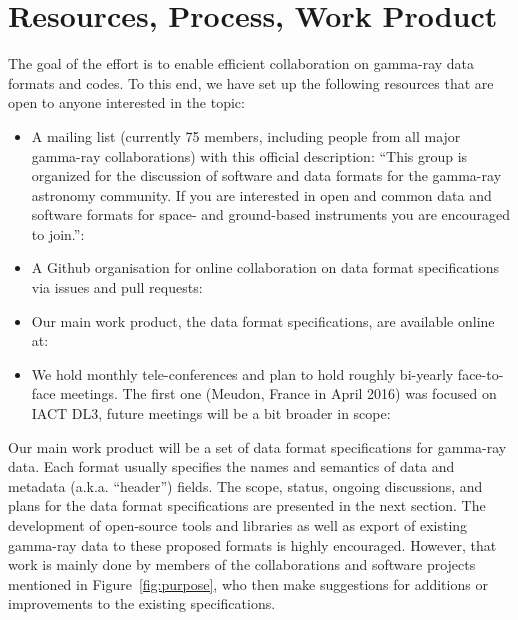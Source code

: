 \section{Resources, Process, Work Product}

The goal of the \gadf effort is to enable efficient collaboration on gamma-ray data formats and codes. To this end, we have set up the following resources that are open to anyone interested in the topic:

\begin{itemize}
\item{} A mailing list (currently 75 members, including people from all major gamma-ray collaborations) with this official description: ``This group is organized for the discussion of software and data formats for the gamma-ray astronomy community. If you are interested in open and common data and software formats for space- and ground-based instruments you are encouraged to join.'': \\ \ogralist
\item{}A Github organisation for online collaboration on data format specifications via issues and pull requests:\\ \gadfgithub
\item{}Our main work product, the data format specifications, are available online at:\\ \gadfrtd
\item{}We hold monthly tele-conferences and plan to hold roughly bi-yearly face-to-face meetings. The first one (Meudon, France in April 2016) was focused on IACT DL3, future meetings will be a bit broader in scope: \ogrameudon
\end{itemize}

Our main work product will be a set of data format specifications for gamma-ray data. Each format usually specifies the names and semantics of data and metadata (a.k.a. ``header'') fields. The scope, status, ongoing discussions, and plans for the data format specifications are presented in the next section. The development of open-source tools and libraries as well as export of existing gamma-ray data to these proposed formats is highly encouraged. However, that work is mainly done by members of the collaborations and software projects mentioned in Figure~\ref{fig:purpose}, who then make suggestions for additions or improvements to the existing specifications.

